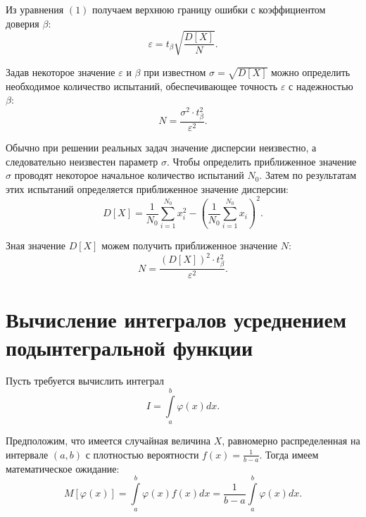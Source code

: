 \documentclass[a4paper,12pt]{article}
\begin{document}
Из уравнения $(1)$ получаем верхнюю границу ошибки с коэффициентом доверия $\beta$:
\begin{equation}
	\varepsilon = t_\beta \sqrt{\frac{D[X]}{N}}.
\end{equation}

Задав некоторое значение $\varepsilon$ и $\beta$ при известном $\sigma = \sqrt{D[X]}$ можно определить необходимое количество испытаний, обеспечивающее точность $\varepsilon$ с надежностью $\beta$:
\begin{equation}
	N = \frac{\sigma^2 \cdot t_\beta^2}{\varepsilon^2}.
\end{equation}

Обычно при решении реальных задач значение дисперсии неизвестно, а следовательно неизвестен параметр $\sigma$. Чтобы определить приближенное значение $\sigma$ проводят некоторое начальное количество испытаний $N_0$. Затем по результатам этих испытаний определяется приближенное значение дисперсии:
\begin{equation}
	D[X] = \frac{1}{N_0} \sum_{i=1}^{N_0} x_i^2 - \left ( \frac{1}{N_0} \sum_{i=1}^{N_0} x_i \right ) ^2.
\end{equation}

Зная значение $D[X]$ можем получить приближенное значение $N$:
\begin{equation}
	N = \frac{(D[X])^2 \cdot t_\beta^2}{\varepsilon^2}.
\end{equation}



\newpage
\section{Вычисление интегралов усреднением подынтегральной функции}

Пусть требуется вычислить интеграл
\begin{equation}
	I = \int\limits_a^b \varphi(x)dx.
\end{equation}

Предположим, что имеется случайная величина $X$, равномерно распределенная на интервале $(a, b)$ с плотностью вероятности $f(x) = \frac{1}{b-a}$. Тогда имеем математическое ожидание:
\begin{equation}
	M[\varphi(x)] = \int\limits_a^b \varphi(x)f(x)dx = \frac{1}{b-a}\int\limits_a^b \varphi(x)dx.
\end{equation}
\end{document}
